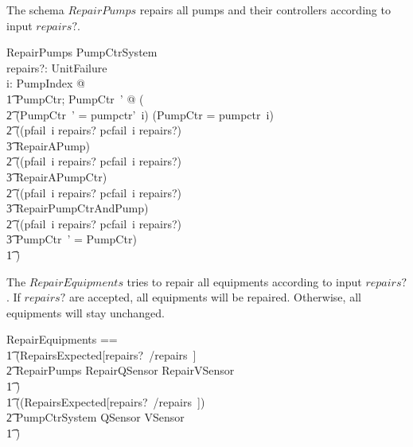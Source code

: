 \documentclass{report} %
\begin{document}
The schema $RepairPumps$ repairs all pumps and their controllers according to input $repairs?$.
\begin{schema}{RepairPumps}
  \Delta PumpCtrSystem \\
  repairs?: \power UnitFailure \\
  \where %
  \forall i: PumpIndex @ \\ 
  \t1 \exists PumpCtr; PumpCtr~' @ ( \\
    \t2 (\theta PumpCtr~' = pumpctr'~i) \land (\theta PumpCtr = pumpctr~i) \land \\
    \t2 ((pfail~i \in repairs? \land pcfail~i \notin repairs?) \\
        \t3 \implies RepairAPump) \land \\
    \t2 ((pfail~i \notin repairs? \land pcfail~i \in repairs?) \\
        \t3 \implies RepairAPumpCtr) \land \\
    \t2 ((pfail~i \in repairs? \land pcfail~i \in repairs?) \\
        \t3 \implies RepairPumpCtrAndPump) \land \\
    \t2 ((pfail~i \notin repairs? \land pcfail~i \notin repairs?) \\
        \t3 \implies \theta PumpCtr~' = \theta PumpCtr) \\
  \t1 )
\end{schema}

The $RepairEquipments$ tries to repair all equipments according to input $repairs?$. If $repairs?$ are accepted, all equipments will be repaired. Otherwise, all equipments will stay unchanged.
\begin{zed}
    RepairEquipments == \\
    \t1 (RepairsExpected[repairs?~/repairs~] \land \\
        \t2 RepairPumps \land RepairQSensor \land RepairVSensor\\
    \t1 ) \lor \\
    \t1 ((\lnot RepairsExpected[repairs?~/repairs~]) \land \\
        \t2 \Xi PumpCtrSystem \land \Xi QSensor \land \Xi VSensor\\
    \t1 )
\end{zed}
\end{document}
